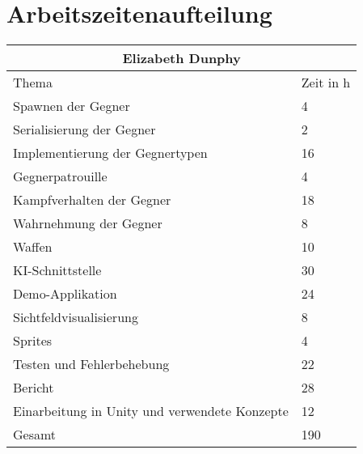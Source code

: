 \section{Arbeitszeitenaufteilung}\label{sec:workingTimes}
\begin{tabular}{|l|l|}
	\hline
	\multicolumn{2}{|c|}{Elizabeth Dunphy} \\
	\hline
	Thema & Zeit in h \\
  	\hline
  	Spawnen der Gegner & 4 \\
  	\hline
  	Serialisierung der Gegner & 2 \\
  	\hline
  	Implementierung der Gegnertypen & 16 \\
  	\hline
  	Gegnerpatrouille & 4 \\
  	\hline
  	Kampfverhalten der Gegner & 18 \\
  	\hline
  	Wahrnehmung der Gegner & 8 \\
  	\hline
  	Waffen & 10 \\
  	\hline
  	KI-Schnittstelle & 30 \\
  	\hline
  	Demo-Applikation & 24 \\
  	\hline
  	Sichtfeldvisualisierung & 8 \\
  	\hline
  	Sprites & 4 \\
  	\hline
  	Testen und Fehlerbehebung & 22 \\
	\hline
  	Bericht & 28 \\
  	\hline
  	Einarbeitung in Unity und verwendete Konzepte & 12 \\
	\hline
	Gesamt & 190 \\
	\hline
\end{tabular}

